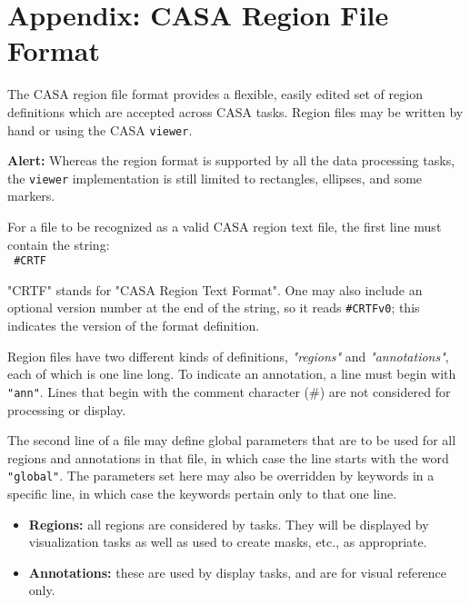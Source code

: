 

\chapter[Appendix: CASA Region File Format]
         {Appendix: CASA Region File Format}
\label{chapter:regionformat}


The CASA region file format provides a flexible, easily edited set of
region definitions which are accepted across CASA tasks.  Region files
may be written by hand or using the CASA {\tt viewer}.

{\bf Alert:} Whereas the region format is supported by all the data
  processing tasks, the {\tt viewer} implementation is still limited
  to rectangles, ellipses, and some markers.


For a file to be recognized as a valid CASA region text file, the
first line must contain the string:\\

{\tt 
\#CRTF
}


"CRTF" stands for "CASA Region Text Format".  One may also include an
optional version number at the end of the string, so it reads
{\tt \#CRTFv0}; this indicates the version of the format
definition.

Region files have two different kinds of definitions, {\it "regions"} and
{\it "annotations"}, each of which is one line long. To indicate an
annotation, a line must begin with {\tt "ann"}.  Lines that begin with the
comment character (\#) are not considered for processing or display.

The second line of a file may define global parameters that are to be
used for all regions and annotations in that file, in which case the
line starts with the word {\tt "global"}.  The parameters set here may
also be overridden by keywords in a specific line, in which case the
keywords pertain only to that one line.

\begin{itemize}

\item {\bf Regions:} all regions are considered by tasks.  They will
  be displayed by visualization tasks as well as used to create masks,
  etc., as appropriate.

\item {\bf Annotations:} these are used by display tasks, and are for
  visual reference only.

\end{itemize}

